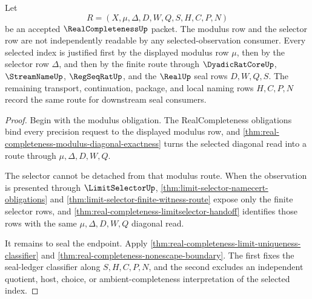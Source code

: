 \begin{theorem}
\label{thm:real-completeness-modulus-selector-factorization}
Let
$$
R=(X,\mu,\Delta,D,W,Q,S,H,C,P,N)
$$
be an accepted $\RealCompletenessUp$ packet. The modulus row and the selector row are not independently readable by any selected-observation consumer. Every selected index is justified first by the displayed modulus row $\mu$, then by the selector row $\Delta$, and then by the finite route through $\DyadicRatCoreUp$, $\StreamNameUp$, $\RegSeqRatUp$, and the $\RealUp$ seal rows $D,W,Q,S$. The remaining transport, continuation, package, and local naming rows $H,C,P,N$ record the same route for downstream seal consumers.
\end{theorem}
\begin{proof}
Begin with the modulus obligation. The RealCompleteness obligations bind every precision request to the displayed modulus row, and \autoref{thm:real-completeness-modulus-diagonal-exactness} turns the selected diagonal read into a route through $\mu,\Delta,D,W,Q$.

The selector cannot be detached from that modulus route. When the observation is presented through $\LimitSelectorUp$, \autoref{thm:limit-selector-namecert-obligations} and \autoref{thm:limit-selector-finite-witness-route} expose only the finite selector rows, and \autoref{thm:real-completeness-limitselector-handoff} identifies those rows with the same $\mu,\Delta,D,W,Q$ diagonal read.

It remains to seal the endpoint. Apply \autoref{thm:real-completeness-limit-uniqueness-classifier} and \autoref{thm:real-completeness-nonescape-boundary}. The first fixes the seal-ledger classifier along $S,H,C,P,N$, and the second excludes an independent quotient, host, choice, or ambient-completeness interpretation of the selected index.
\end{proof}

